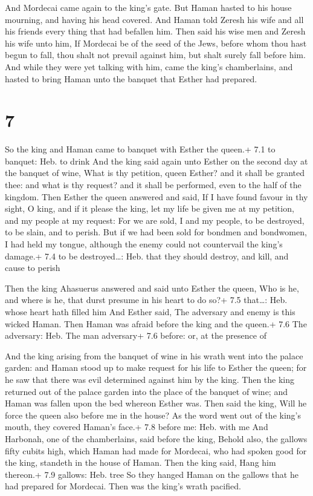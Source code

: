  And Mordecai came again to the king's gate. But Haman
hasted to his house mourning, and having his head covered. 
And Haman told Zeresh his wife and all his friends every thing that had
befallen him. Then said his wise men and Zeresh his wife unto him, If
Mordecai be of the seed of the Jews, before whom thou hast begun to
fall, thou shalt not prevail against him, but shalt surely fall before
him.  And while they were yet talking with him, came the
king's chamberlains, and hasted to bring Haman unto the banquet that
Esther had prepared.

\hypertarget{section-6}{%
\section{7}\label{section-6}}

 So the king and Haman came to banquet with Esther the
queen.+ 7.1 to banquet: Heb. to drink  And the king said
again unto Esther on the second day at the banquet of wine, What is thy
petition, queen Esther? and it shall be granted thee: and what is thy
request? and it shall be performed, even to the half of the kingdom.
 Then Esther the queen answered and said, If I have found
favour in thy sight, O king, and if it please the king, let my life be
given me at my petition, and my people at my request:  For
we are sold, I and my people, to be destroyed, to be slain, and to
perish. But if we had been sold for bondmen and bondwomen, I had held my
tongue, although the enemy could not countervail the king's damage.+ 7.4
to be destroyed\ldots: Heb. that they should destroy, and kill, and
cause to perish

 Then the king Ahasuerus answered and said unto Esther the
queen, Who is he, and where is he, that durst presume in his heart to do
so?+ 7.5 that\ldots: Heb. whose heart hath filled him  And
Esther said, The adversary and enemy is this wicked Haman. Then Haman
was afraid before the king and the queen.+ 7.6 The adversary: Heb. The
man adversary+ 7.6 before: or, at the presence of

 And the king arising from the banquet of wine in his
wrath went into the palace garden: and Haman stood up to make request
for his life to Esther the queen; for he saw that there was evil
determined against him by the king.  Then the king returned
out of the palace garden into the place of the banquet of wine; and
Haman was fallen upon the bed whereon Esther was. Then said the king,
Will he force the queen also before me in the house? As the word went
out of the king's mouth, they covered Haman's face.+ 7.8 before me: Heb.
with me  And Harbonah, one of the chamberlains, said before
the king, Behold also, the gallows fifty cubits high, which Haman had
made for Mordecai, who had spoken good for the king, standeth in the
house of Haman. Then the king said, Hang him thereon.+ 7.9 gallows: Heb.
tree  So they hanged Haman on the gallows that he had
prepared for Mordecai. Then was the king's wrath pacified.

